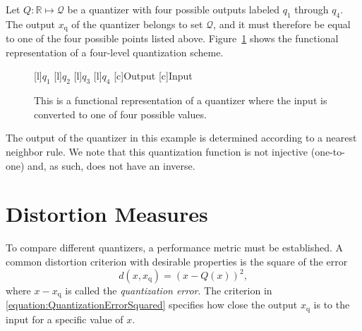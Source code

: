 \begin{example}
Let $Q : \mathbb{R} \mapsto \mathcal{Q}$ be a quantizer with four possible outputs labeled $q_1$ through $q_4$.
The output $x_{\mathrm{q}}$ of the quantizer belongs to set $\mathcal{Q}$, and it must therefore be equal to one of the four possible points listed above.
Figure~\ref{figure:Quantizer} shows the functional representation of a four-level quantization scheme.
\begin{figure}[htbp]
\begin{center}
\begin{psfrags}
[l]{$q_1$}
[l]{$q_2$}
[l]{$q_3$}
[l]{$q_4$}
[c]{Output}
[c]{Input}
\end{psfrags}
\caption{This is a functional representation of a quantizer where the input is converted to one of four possible values.}
\label{figure:Quantizer}
\end{center}
\end{figure}
The output of the quantizer in this example is determined according to a nearest neighbor rule.
We note that this quantization function is not injective (one-to-one) and, as such, does not have an inverse.
\end{example}


\section{Distortion Measures}

To compare different quantizers, a performance metric must be established.
A common distortion criterion with desirable properties is the square of the error
\begin{equation} \label{equation:QuantizationErrorSquared}
d(x, x_{\mathrm{q}}) = (x - Q(x))^2 ,
\end{equation}
where $x - x_{\mathrm{q}}$ is called the \emph{quantization error}.
The criterion in \eqref{equation:QuantizationErrorSquared} specifies how close the output $x_{\mathrm{q}}$ is to the input for a specific value of $x$.

